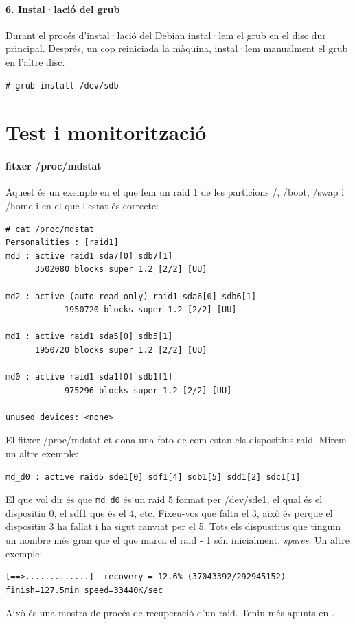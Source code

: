 \documentclass[a4paper]{article}
\begin{document}
\paragraph{6. Instal·lació del grub}
Durant el proc\'es d'instal·lació del Debian instal·lem el grub en el disc dur principal. Despr\'es, un cop reiniciada la màquina, instal·lem manualment el grub en l'altre disc.
\begin{verbatim}
# grub-install /dev/sdb
\end{verbatim}
\section{Test i monitorització}
\paragraph{fitxer /proc/mdstat\\}
Aquest \'es un exemple en el que fem un raid 1 de les particions /, /boot, /swap i /home i en el que l'estat \'es correcte:
\begin{verbatim}
# cat /proc/mdstat 
Personalities : [raid1] 
md3 : active raid1 sda7[0] sdb7[1]
      3502080 blocks super 1.2 [2/2] [UU]
			      
md2 : active (auto-read-only) raid1 sda6[0] sdb6[1]
			1950720 blocks super 1.2 [2/2] [UU]
						      
md1 : active raid1 sda5[0] sdb5[1]
      1950720 blocks super 1.2 [2/2] [UU]
									      
md0 : active raid1 sda1[0] sdb1[1]
 			975296 blocks super 1.2 [2/2] [UU]
												      
unused devices: <none>
\end{verbatim}
El fitxer /proc/mdstat et dona una foto de com estan els dispositius raid. Mirem un altre exemple:
\begin{verbatim}
md_d0 : active raid5 sde1[0] sdf1[4] sdb1[5] sdd1[2] sdc1[1]
\end{verbatim}
El que vol dir \'es que \verb+md_d0+ \'es un raid 5 format per /dev/sde1, el qual \'es el dispositiu 0, el sdf1 que \'es el 4, etc. Fixeu-vos que falta el 3, això \'es perque el dispositiu 3 ha fallat i ha sigut canviat per el 5. Tots els dispusitius que tinguin un nombre m\'es gran que el que marca el raid - 1 són inicialment, \textit{spares}. Un altre exemple: 
\begin{verbatim}
[==>.............]  recovery = 12.6% (37043392/292945152) finish=127.5min speed=33440K/sec
\end{verbatim}
Això \'es una mostra de proc\'es de recuperació d'un raid. Teniu m\'es apunts en \cite{PROCMDSTAT}.
\end{document}
